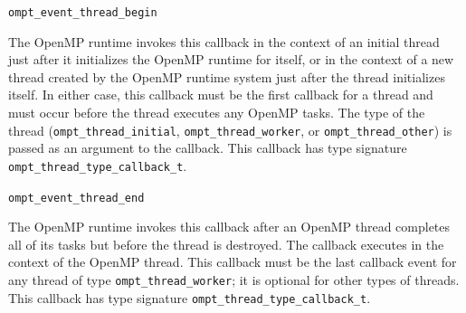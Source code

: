 \documentclass{article}
\begin{document}
\begin{description}

\item \verb|ompt_event_thread_begin|

The OpenMP runtime invokes this callback in the context of an initial thread just after it initializes the OpenMP runtime for itself, or in the context of a new thread created by the OpenMP runtime system just after the thread initializes itself. In either case, this callback must be the first callback for a thread
and must occur before the thread executes any OpenMP tasks. The type of the thread (\verb|ompt_thread_initial|, \verb|ompt_thread_worker|, or \verb|ompt_thread_other|) is passed as an argument to the callback. This callback has type signature \verb|ompt_thread_type_callback_t|. 


\item \verb|ompt_event_thread_end|

The OpenMP runtime invokes this callback
after an OpenMP thread completes all of
its tasks but before the thread is destroyed. The callback
executes in the context of the OpenMP thread. This callback must be the last callback event for any thread of type \verb|ompt_thread_worker|; it is optional for other types of threads.
This callback has type signature \verb|ompt_thread_type_callback_t|. 

\end{description}
\end{document}
